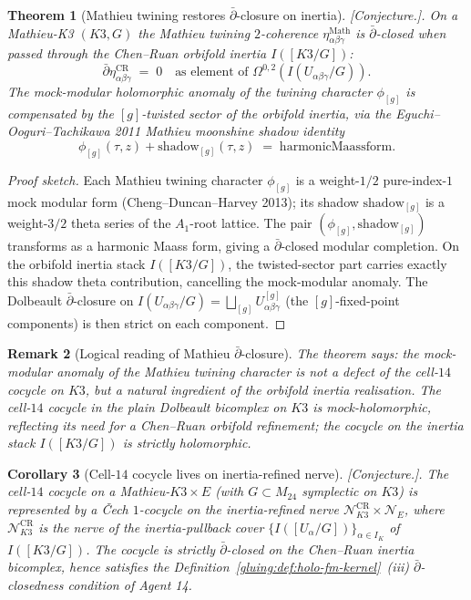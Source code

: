 \documentclass[11pt]{amsart}
\newtheorem{theorem}{Theorem}[section]
\newtheorem{corollary}[theorem]{Corollary}
\newtheorem{remark}[theorem]{Remark}
\providecommand{\cN}{\mathcal{N}}
\providecommand{\ClaimStatusConjectured}{[\emph{Conjecture.}]}
\begin{document}
\begin{theorem}[Mathieu twining restores $\bar\partial$-closure on inertia]
\label{thm:R13-mathieu-dbar-closed}
\ClaimStatusConjectured.
On a Mathieu-K3 $(K3, G)$ the Mathieu twining $2$-coherence
$\eta_{\alpha\beta\gamma}^{\mathrm{Math}}$ is $\bar\partial$-closed
when passed through the Chen--Ruan orbifold inertia $I([K3/G])$:
\[
  \bar\partial \eta_{\alpha\beta\gamma}^{\mathrm{CR}} \;=\; 0
  \quad \text{as element of } \Omega^{0, 2}(I(U_{\alpha\beta\gamma}/G)).
\]
The mock-modular holomorphic anomaly of the twining character
$\phi_{[g]}$ is compensated by the $[g]$-twisted sector of the
orbifold inertia, via the Eguchi--Ooguri--Tachikawa 2011 Mathieu
moonshine shadow identity
\[
  \phi_{[g]}(\tau, z) + \mathrm{shadow}_{[g]}(\tau, z) \;=\;
  \mathrm{harmonic Maass form}.
\]
\end{theorem}

\begin{proof}[Proof sketch]
Each Mathieu twining character $\phi_{[g]}$ is a weight-$1/2$
pure-index-$1$ mock modular form (Cheng--Duncan--Harvey 2013); its
shadow $\mathrm{shadow}_{[g]}$ is a weight-$3/2$ theta series of
the $A_1$-root lattice. The pair $(\phi_{[g]}, \mathrm{shadow}_{[g]})$
transforms as a harmonic Maass form, giving a $\bar\partial$-closed
modular completion. On the orbifold inertia stack $I([K3/G])$, the
twisted-sector part carries exactly this shadow theta contribution,
cancelling the mock-modular anomaly. The Dolbeault
$\bar\partial$-closure on
$I(U_{\alpha\beta\gamma}/G) = \bigsqcup_{[g]} U_{\alpha\beta\gamma}^{[g]}$
(the $[g]$-fixed-point components) is then strict on each component.
\end{proof}

\begin{remark}[Logical reading of Mathieu $\bar\partial$-closure]
\label{rem:R13-mathieu-closure-reading}
The theorem says: the mock-modular anomaly of the Mathieu twining
character is \emph{not} a defect of the cell-$14$ cocycle on
$K3$, but a natural ingredient of the orbifold inertia
realisation. The cell-$14$ cocycle in the plain Dolbeault bicomplex on
$K3$ is mock-holomorphic, reflecting its need for a
Chen--Ruan orbifold refinement; the cocycle on the inertia stack
$I([K3/G])$ is strictly holomorphic.
\end{remark}

\begin{corollary}[Cell-$14$ cocycle lives on inertia-refined nerve]
\label{cor:R13-inertia-refined-nerve}
\ClaimStatusConjectured.
The cell-$14$ cocycle on a Mathieu-$K3 \times E$ (with $G \subset
M_{24}$ symplectic on $K3$) is represented by a \v{C}ech $1$-cocycle
on the inertia-refined nerve
$\cN_{K3}^{\mathrm{CR}} \times \cN_E$, where
$\cN_{K3}^{\mathrm{CR}}$ is the nerve of the inertia-pullback cover
$\{I([U_\alpha/G])\}_{\alpha \in I_K}$ of
$I([K3/G])$. The cocycle is strictly $\bar\partial$-closed on the
Chen--Ruan inertia bicomplex, hence satisfies the
Definition~\ref{gluing:def:holo-fm-kernel}~(iii)
$\bar\partial$-closedness condition of Agent 14.
\end{corollary}
\end{document}
